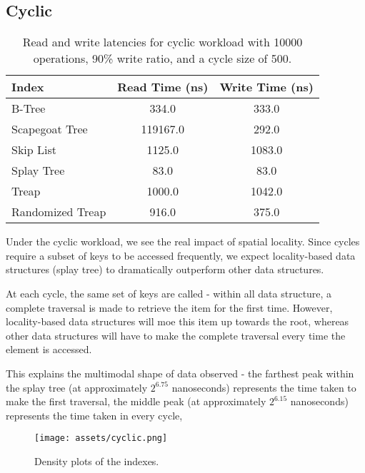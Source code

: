 \documentclass[sigconf]{acmart}
\begin{document}
\subsection{Cyclic}
\begin{center}
  \begin{table}[H]
    \begin{tabular}{|l|c|c|}
      \hline
      \bf{Index} & \bf{Read Time (ns)} & \bf{Write Time (ns)} \\
      \hline
      B-Tree&334.0&333.0\\
      \hline
      Scapegoat Tree&119167.0&292.0\\
      \hline
      Skip List&1125.0&1083.0\\
      \hline
      Splay Tree&83.0&83.0\\
      \hline
      Treap&1000.0&1042.0\\
      \hline
      Randomized Treap&916.0&375.0\\
      \hline
    \end{tabular}
    \caption{Read and write latencies for cyclic workload with 10000 operations, 90\% write ratio, and a cycle size of 500.}
  \end{table}
\end{center}

Under the cyclic workload, we see the real impact of spatial locality. Since cycles require a subset of keys to be accessed frequently, we expect locality-based data structures (splay tree) to dramatically outperform other data structures.

At each cycle, the same set of keys are called - within all data structure, a complete traversal is made to retrieve the item for the first time. However, locality-based data structures will moe this item up towards the root, whereas other data structures will have to make the complete traversal every time the element is accessed. 

This explains the multimodal shape of data observed - the farthest peak within the splay tree (at approximately $2^{6.75}$ nanoseconds) represents the time taken to make the first traversal, the middle peak (at approximately $2^{6.15}$ nanoseconds) represents the time taken in every cycle, 

\begin{center}
  \begin{figure}[H]
    \texttt{[image: assets/cyclic.png]}
    \caption{Density plots of the indexes. }
  \end{figure}
\end{center}
\newpage
\end{document}
